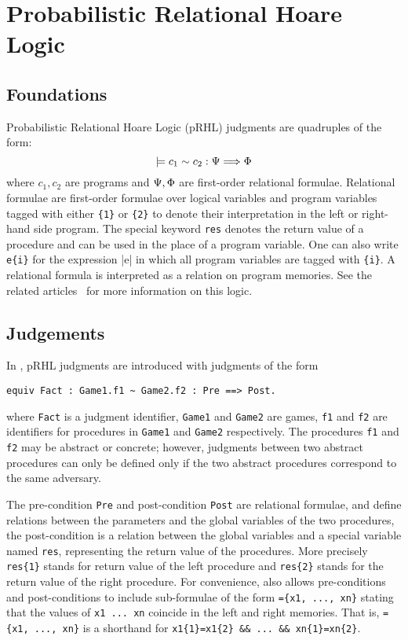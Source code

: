 \chapter{Probabilistic Relational Hoare Logic}

\section{Foundations}
Probabilistic Relational Hoare Logic (pRHL) judgments are quadruples
of the form:
%
$$ \models {c_1} \sim {c_2} : {\Psi} \Longrightarrow {\Phi} $$
%
where $c_1, c_2$ are programs and $\Psi, \Phi$ are first-order
relational formulae. Relational formulae are first-order formulae over
logical variables and program variables tagged with either \verb|{1}|
or \verb|{2}| to denote their interpretation in the left or right-hand
side program. The special keyword \verb|res| denotes the return value
of a procedure and can be used in the place of a program variable. One
can also write \verb|e{i}| for the expression |e| in which all program
variables are tagged with \verb|{i}|. A relational formula is
interpreted as a relation on program memories.  See the related
articles~\cite{Barthe:2009} for more information on this logic.

\section{Judgements}
In \EasyCrypt, pRHL judgments are introduced with judgments
of the form
\begin{verbatim}
equiv Fact : Game1.f1 ~ Game2.f2 : Pre ==> Post.
\end{verbatim}
where \verb|Fact| is a judgment identifier, \verb!Game1! and
\verb!Game2! are games, \verb!f1! and \verb!f2! are identifiers for
procedures in \verb!Game1! and \verb!Game2! respectively. The
procedures \verb!f1! and \verb!f2! may be abstract or concrete;
however, judgments between two abstract procedures can only be defined
only if the two abstract procedures correspond to the same adversary.

The pre-condition \verb!Pre! and post-condition \verb!Post! are
relational formulae, and define relations between the parameters and
the global variables of the two procedures, the post-condition is a
relation between the global variables and a special variable named
\verb+res+, representing the return value of the procedures.  More
precisely \verb+res{1}+ stands for return value of the left procedure
and \verb+res{2}+ stands for the return value of the right
procedure. For convenience, \EasyCrypt also allows pre-conditions and
post-conditions to include sub-formulae of the form
\verb!={x1, ..., xn}! stating that the values of \verb!x1 ... xn!
  coincide in the left and right memories. That is,
  \verb!={x1, ..., xn}! is a shorthand for
  \verb!x1{1}=x1{2} && ... && xn{1}=xn{2}!.

